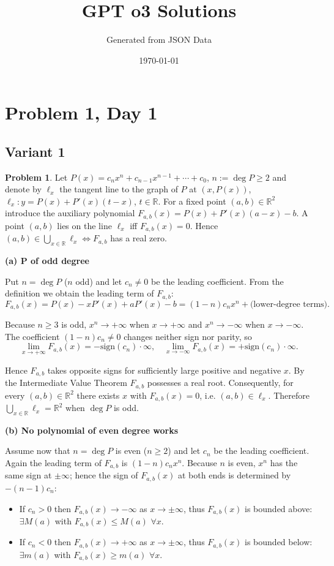 \documentclass[12pt,a4paper]{article}
\title{GPT o3 Solutions}
\author{Generated from JSON Data}
\date{\today}
\theoremstyle{definition}
\newtheorem{problem}{Problem}
\begin{document}
    \maketitle
    \tableofcontents
    \newpage

    \section{Problem 1, Day 1}

    \subsection{Variant 1}
    \begin{problem}
        Let $P(x)=c_{n}x^{n}+c_{n-1}x^{n-1}+\cdots+c_{0}$, $n:=\deg P\geq2$ and denote by $\ell_x$ the tangent line to the graph of $P$ at $(x,P(x))$, $\ell_x : y = P(x)+P'(x)(t-x)$, $t\in\mathbb{R}$. For a fixed point $(a,b)\in\mathbb{R}^2$ introduce the auxiliary polynomial $F_{a,b}(x)=P(x)+P'(x)(a-x)-b$. A point $(a,b)$ lies on the line $\ell_x$ iff $F_{a,b}(x)=0$. Hence $(a,b)\in\bigcup_{x\in\mathbb{R}}\ell_x \Leftrightarrow F_{a,b}$ has a real zero.

        \textbf{(a) P of odd degree}

        Put $n=\deg P$ ($n$ odd) and let $c_n\neq0$ be the leading coefficient. From the definition we obtain the leading term of $F_{a,b}$:
        \[F_{a,b}(x)=P(x)-xP'(x)+aP'(x)-b =(1-n)c_nx^{n}+ \text{(lower-degree terms)}.\]

        Because $n\geq3$ is odd, $x^{n}\to+\infty$ when $x\to+\infty$ and $x^{n}\to-\infty$ when $x\to-\infty$. The coefficient $(1-n)c_n\neq0$ changes neither sign nor parity, so
        \[\lim_{x\to+\infty}F_{a,b}(x)=-\text{sign}(c_n)\cdot\infty, \quad \lim_{x\to-\infty}F_{a,b}(x)=+\text{sign}(c_n)\cdot\infty.\]

        Hence $F_{a,b}$ takes opposite signs for sufficiently large positive and negative $x$. By the Intermediate Value Theorem $F_{a,b}$ possesses a real root. Consequently, for every $(a,b)\in\mathbb{R}^2$ there exists $x$ with $F_{a,b}(x)=0$, i.e. $(a,b)\in\ell_x$. Therefore $\bigcup_{x\in\mathbb{R}}\ell_x = \mathbb{R}^2$ when $\deg P$ is odd.

        \textbf{(b) No polynomial of even degree works}

        Assume now that $n=\deg P$ is even ($n\geq2$) and let $c_n$ be the leading coefficient. Again the leading term of $F_{a,b}$ is $(1-n)c_nx^{n}$. Because $n$ is even, $x^{n}$ has the same sign at $\pm\infty$; hence the sign of $F_{a,b}(x)$ at both ends is determined by $-(n-1)c_n$:
        \begin{itemize}
            \item If $c_n>0$ then $F_{a,b}(x)\to-\infty$ as $x\to\pm\infty$, thus $F_{a,b}(x)$ is bounded above: $\exists M(a)$ with $F_{a,b}(x)\leq M(a)$ $\forall x$.
            \item If $c_n<0$ then $F_{a,b}(x)\to+\infty$ as $x\to\pm\infty$, thus $F_{a,b}(x)$ is bounded below: $\exists m(a)$ with $F_{a,b}(x)\geq m(a)$ $\forall x$.
        \end{itemize}


\end{problem}
\end{document}
